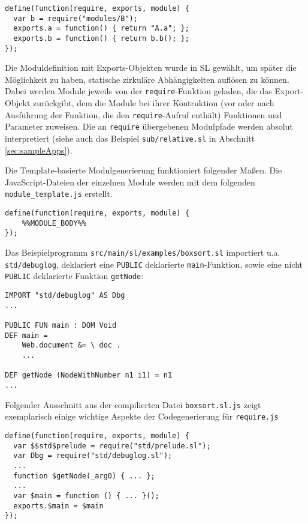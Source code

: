\documentclass[runningheads]{llncs}
\begin{document}
\begin{verbatim}
define(function(require, exports, module) {
  var b = require("modules/B");
  exports.a = function() { return "A.a"; };
  exports.b = function() { return b.b(); };
});
\end{verbatim}

Die Moduldefinition mit Exports-Objekten wurde in SL
gewählt, um später die Möglichkeit zu haben, statische zirkuläre
Abhängigkeiten auflösen zu können. Dabei werden Module jeweils von
der \texttt{require}-Funktion geladen, die das Export-Objekt
zurückgibt, dem die Module bei ihrer Kontruktion (vor oder nach
Ausführung der Funktion, die den \texttt{require}-Aufruf enthält)
Funktionen und Parameter zuweisen. Die an \texttt{require} übergebenen
Modulpfade werden absolut interpretiert (siehe auch das Beispiel
\texttt{sub/relative.sl} in Abschnitt \ref{sec:sampleApps}).

Die Template-basierte Modulgenerierung funktioniert folgender Maßen.
Die JavaScript-Dateien der einzelnen Module werden mit dem folgenden
\texttt{module\_template.js} erstellt.

\begin{verbatim}
define(function(require, exports, module) {
    %%MODULE_BODY%%
});
\end{verbatim}

Das Beispielprogramm \texttt{src/main/sl/examples/boxsort.sl}
importiert u.a. \texttt{std/debuglog}, deklariert eine \texttt{PUBLIC}
deklarierte \texttt{main}-Funktion, sowie eine nicht \texttt{PUBLIC}
deklarierte Funktion \texttt{getNode}:

\begin{verbatim}
IMPORT "std/debuglog" AS Dbg
...

PUBLIC FUN main : DOM Void
DEF main = 
	Web.document &= \ doc .
    ...
    
DEF getNode (NodeWithNumber n1 i1) = n1
...
\end{verbatim}

Folgender Ausschnitt aus der compilierten Datei \texttt{boxsort.sl.js}
zeigt exemplarisch einige wichtige Aspekte der Codegenerierung für
\texttt{require.js}

\begin{verbatim}
define(function(require, exports, module) {
  var $$std$prelude = require("std/prelude.sl");
  var Dbg = require("std/debuglog.sl");
  ...
  function $getNode(_arg0) { ... };
  ...
  var $main = function () { ... }();
  exports.$main = $main
});
\end{verbatim}
\end{document}
